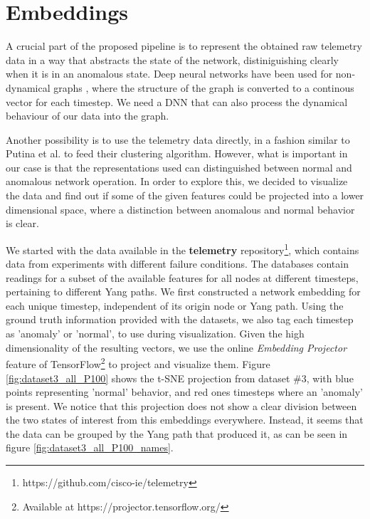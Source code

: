 \newpage
\section{Embeddings}
\label{sec:embeddings}

A crucial part of the proposed pipeline is to represent the obtained raw telemetry data in a way that abstracts the state of the network, distiniguishing clearly when it is in an anomalous state.
Deep neural networks have been used for non-dynamical graphs \cite{venkatakrishnan_graph2seq_2018}, where the structure of the graph is converted to a continous vector for each timestep.
We need a DNN that can also process the dynamical behaviour of our data into the graph.

Another possibility is to use the telemetry data directly, in a fashion similar to Putina et al.\cite{putina_telemetry-based_2018} to feed their clustering algorithm.
However, what is important in our case is that the representations used can distinguished between normal and anomalous network operation.
In order to explore this, we decided to visualize the data and find out if some of the given features could be projected into a lower dimensional space, where a distinction between anomalous and normal behavior is clear.

We started with the data available in the \textbf{telemetry} repository\footnote{https://github.com/cisco-ie/telemetry}, which contains data from experiments with different failure conditions.
The databases contain readings for a subset of the available features for all nodes at different timesteps, pertaining to different Yang paths.
We first constructed a network embedding for each unique timestep, independent of its origin node or Yang path.
Using the ground truth information provided with the datasets, we also tag each timestep as 'anomaly' or 'normal', to use during visualization.
Given the high dimensionality of the resulting vectors, we use the online \textit{Embedding Projector} feature of TensorFlow\footnote{Available at https://projector.tensorflow.org/} to project and visualize them.
Figure \ref{fig:dataset3_all_P100} shows the t-SNE projection from dataset \#3, with blue points representing 'normal' behavior, and red ones timesteps where an 'anomaly' is present.
We notice that this projection does not show a clear division between the two states of interest from this embeddings everywhere.
Instead, it seems that the data can be grouped by the Yang path that produced it, as can be seen in figure \ref{fig:dataset3_all_P100_names}.

